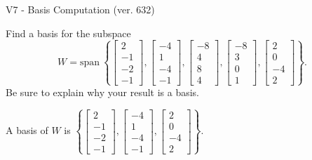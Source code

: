 \begin{exercise}
  \begin{exerciseTitle}V7 - Basis Computation (ver. 632)\end{exerciseTitle}
  \begin{exerciseStatement}
    Find a basis for the subspace 
\[W=\mathrm{span}\ \left\{\left[\begin{array}{r}
2 \\
-1 \\
-2 \\
-1
\end{array}\right] , \left[\begin{array}{r}
-4 \\
1 \\
-4 \\
-1
\end{array}\right] , \left[\begin{array}{r}
-8 \\
4 \\
8 \\
4
\end{array}\right] , \left[\begin{array}{r}
-8 \\
3 \\
0 \\
1
\end{array}\right] , \left[\begin{array}{r}
2 \\
0 \\
-4 \\
2
\end{array}\right]\right\}.\]
 Be sure to explain why your result is a basis.


  \end{exerciseStatement}
  \begin{exerciseAnswer}
   A basis of \(W\) is  \(\left\{\left[\begin{array}{r}
2 \\
-1 \\
-2 \\
-1
\end{array}\right] , \left[\begin{array}{r}
-4 \\
1 \\
-4 \\
-1
\end{array}\right] , \left[\begin{array}{r}
2 \\
0 \\
-4 \\
2
\end{array}\right]\right\}\).
  


  \end{exerciseAnswer}
\end{exercise}
